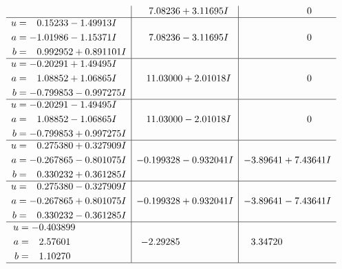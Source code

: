 \documentclass[1p]{elsarticle_modified}
\theoremstyle{definition}
\begin{document}
$$\begin{array}{c|c|c}
 & \phantom{-}7.08236 + 3.11695 I & \phantom{-0.000000 } 0 \\ \hline\begin{aligned}
u &= \phantom{-}0.15233 - 1.49913 I \\
a &= -1.01986 - 1.15371 I \\
b &= \phantom{-}0.992952 + 0.891101 I\end{aligned}
 & \phantom{-}7.08236 - 3.11695 I & \phantom{-0.000000 } 0 \\ \hline\begin{aligned}
u &= -0.20291 + 1.49495 I \\
a &= \phantom{-}1.08852 + 1.06865 I \\
b &= -0.799853 - 0.997275 I\end{aligned}
 & \phantom{-}11.03000 + 2.01018 I & \phantom{-0.000000 } 0 \\ \hline\begin{aligned}
u &= -0.20291 - 1.49495 I \\
a &= \phantom{-}1.08852 - 1.06865 I \\
b &= -0.799853 + 0.997275 I\end{aligned}
 & \phantom{-}11.03000 - 2.01018 I & \phantom{-0.000000 } 0 \\ \hline\begin{aligned}
u &= \phantom{-}0.275380 + 0.327909 I \\
a &= -0.267865 - 0.801075 I \\
b &= \phantom{-}0.330232 + 0.361285 I\end{aligned}
 & -0.199328 - 0.932041 I & -3.89641 + 7.43641 I \\ \hline\begin{aligned}
u &= \phantom{-}0.275380 - 0.327909 I \\
a &= -0.267865 + 0.801075 I \\
b &= \phantom{-}0.330232 - 0.361285 I\end{aligned}
 & -0.199328 + 0.932041 I & -3.89641 - 7.43641 I \\ \hline\begin{aligned}
u &= -0.403899\phantom{ +0.000000I} \\
a &= \phantom{-}2.57601\phantom{ +0.000000I} \\
b &= \phantom{-}1.10270\phantom{ +0.000000I}\end{aligned}
 & -2.29285\phantom{ +0.000000I} & \phantom{-}3.34720\phantom{ +0.000000I}\\
 \hline 
 \end{array}$$\newpage\newpage\renewcommand{\arraystretch}{1}
\end{document}

